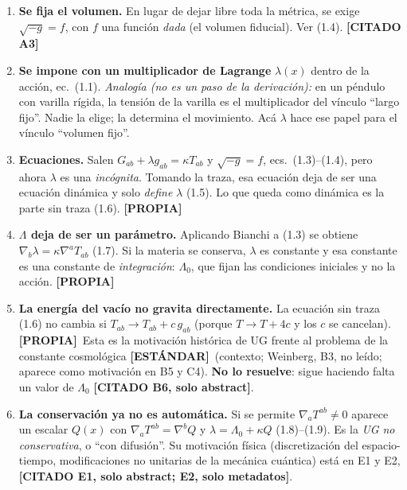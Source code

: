 \documentclass[11pt,a4paper]{article}
\newcommand{\propia}{{\bfseries\color{TealBlue}[PROPIA]}}
\newcommand{\estandar}{{\bfseries\color{BurntOrange}[ESTÁNDAR]}}
\newcommand{\citado}[1]{{\bfseries\color{RoyalBlue}[CITADO #1]}}
\begin{document}
\begin{enumerate}
\item \textbf{Se fija el volumen.} En lugar de dejar libre toda la métrica, se exige $\sqrt{-g}=f$, con $f$ una función \emph{dada} (el volumen fiducial). Ver (1.4). \citado{A3}
\item \textbf{Se impone con un multiplicador de Lagrange} $\lambda(x)$ dentro de la acción, ec.~(1.1). \emph{Analogía (no es un paso de la derivación):} en un péndulo con varilla rígida, la tensión de la varilla es el multiplicador del vínculo ``largo fijo''. Nadie la elige; la determina el movimiento. Acá $\lambda$ hace ese papel para el vínculo ``volumen fijo''.
\item \textbf{Ecuaciones.} Salen $G_{ab}+\lambda g_{ab}=\kappa T_{ab}$ y $\sqrt{-g}=f$, ecs.~(1.3)--(1.4), pero ahora $\lambda$ es una \emph{incógnita}. Tomando la traza, esa ecuación deja de ser una ecuación dinámica y solo \emph{define} $\lambda$ (1.5). Lo que queda como dinámica es la parte sin traza (1.6). \propia
\item \textbf{$\Lambda$ deja de ser un parámetro.} Aplicando Bianchi a (1.3) se obtiene $\nabla_b\lambda=\kappa\nabla^aT_{ab}$ (1.7). Si la materia se conserva, $\lambda$ es constante y esa constante es una constante de \emph{integración}: $\Lambda_0$, que fijan las condiciones iniciales y no la acción. \propia
\item \textbf{La energía del vacío no gravita directamente.} La ecuación sin traza (1.6) no cambia si $T_{ab}\to T_{ab}+c\,g_{ab}$ (porque $T\to T+4c$ y los $c$ se cancelan). \propia\ Esta es la motivación histórica de UG frente al problema de la constante cosmológica \estandar\ (contexto; Weinberg, B3, no leído; aparece como motivación en B5 y C4). \textbf{No lo resuelve}: sigue haciendo falta un valor de $\Lambda_0$ \citado{B6, solo abstract}.
\item \textbf{La conservación ya no es automática.} Si se permite $\nabla_aT^{ab}\neq0$ aparece un escalar $Q(x)$ con $\nabla_aT^{ab}=\nabla^bQ$ y $\lambda=\Lambda_0+\kappa Q$ (1.8)--(1.9). Es la \emph{UG no conservativa}, o ``con difusión''. Su motivación física (discretización del espacio-tiempo, modificaciones no unitarias de la mecánica cuántica) está en E1 y E2, \citado{E1, solo abstract; E2, solo metadatos}.
\end{enumerate}
\end{document}
